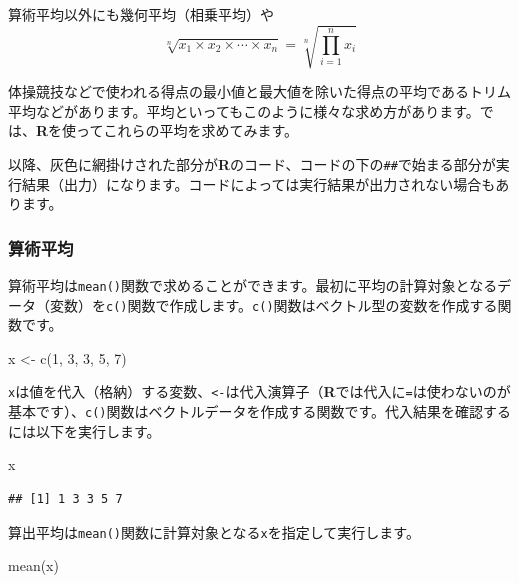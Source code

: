 \documentclass[
  12pt,
]{book}
\newenvironment{Shaded}{\begin{snugshade}}{\end{snugshade}}
\newcommand{\DecValTok}[1]{\textcolor[rgb]{0.00,0.00,0.81}{#1}}
\newcommand{\FunctionTok}[1]{\textcolor[rgb]{0.00,0.00,0.00}{#1}}
\newcommand{\NormalTok}[1]{#1}
\newcommand{\OtherTok}[1]{\textcolor[rgb]{0.56,0.35,0.01}{#1}}
\begin{document}
算術平均以外にも幾何平均（相乗平均）や \begin{equation}
  \sqrt[n]{x_1 \times x_2 \times \cdots \times x_n} = \sqrt[n]{\prod_{i = 1}^n x_i}
\end{equation}

体操競技などで使われる得点の最小値と最大値を除いた得点の平均であるトリム平均などがあります。平均といってもこのように様々な求め方があります。では、\textbf{R}を使ってこれらの平均を求めてみます。

以降、灰色に網掛けされた部分が\textbf{R}のコード、コードの下の\texttt{\#\#}で始まる部分が実行結果（出力）になります。コードによっては実行結果が出力されない場合もあります。

\hypertarget{ux7b97ux8853ux5e73ux5747}{%
\subsubsection{算術平均}\label{ux7b97ux8853ux5e73ux5747}}

算術平均は\texttt{mean()}関数で求めることができます。最初に平均の計算対象となるデータ（変数）を\texttt{c()}関数で作成します。\texttt{c()}関数はベクトル型の変数を作成する関数です。

\begin{Shaded}
\begin{Highlighting}[]
\NormalTok{x }\OtherTok{\textless{}{-}} \FunctionTok{c}\NormalTok{(}\DecValTok{1}\NormalTok{, }\DecValTok{3}\NormalTok{, }\DecValTok{3}\NormalTok{, }\DecValTok{5}\NormalTok{, }\DecValTok{7}\NormalTok{)}
\end{Highlighting}
\end{Shaded}

\texttt{x}は値を代入（格納）する変数、\texttt{\textless{}-}は代入演算子（\textbf{R}では代入に\texttt{=}は使わないのが基本です）、\texttt{c()}関数はベクトルデータを作成する関数です。代入結果を確認するには以下を実行します。

\begin{Shaded}
\begin{Highlighting}[]
\NormalTok{x}
\end{Highlighting}
\end{Shaded}

\begin{verbatim}
## [1] 1 3 3 5 7
\end{verbatim}

算出平均は\texttt{mean()}関数に計算対象となる\texttt{x}を指定して実行します。

\begin{Shaded}
\begin{Highlighting}[]
\FunctionTok{mean}\NormalTok{(x)}
\end{Highlighting}
\end{Shaded}
\end{document}
